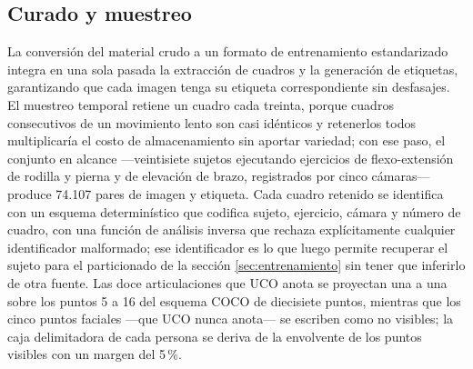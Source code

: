 \documentclass[10pt,a4paper,twocolumn]{article}
\begin{document}
\subsection{Curado y muestreo}
La conversión del material crudo a un formato de entrenamiento estandarizado
integra en una sola pasada la extracción de cuadros y la generación de
etiquetas, garantizando que cada imagen tenga su etiqueta correspondiente sin
desfasajes. El muestreo temporal retiene un cuadro cada treinta, porque
cuadros consecutivos de un movimiento lento son casi idénticos y retenerlos
todos multiplicaría el costo de almacenamiento sin aportar variedad; con ese
paso, el conjunto en alcance —veintisiete sujetos ejecutando ejercicios de
flexo-extensión de rodilla y pierna y de elevación de brazo, registrados por
cinco cámaras— produce 74.107 pares de imagen y etiqueta. Cada cuadro
retenido se identifica con un esquema determinístico que codifica sujeto,
ejercicio, cámara y número de cuadro, con una función de análisis inversa que
rechaza explícitamente cualquier identificador malformado; ese identificador
es lo que luego permite recuperar el sujeto para el particionado de la
sección \ref{sec:entrenamiento} sin tener que inferirlo de otra fuente. Las
doce articulaciones que UCO anota se proyectan una a una sobre los puntos 5 a
16 del esquema COCO de diecisiete puntos, mientras que los cinco puntos
faciales —que UCO nunca anota— se escriben como no visibles; la caja
delimitadora de cada persona se deriva de la envolvente de los puntos
visibles con un margen del 5\,\%.
\end{document}
